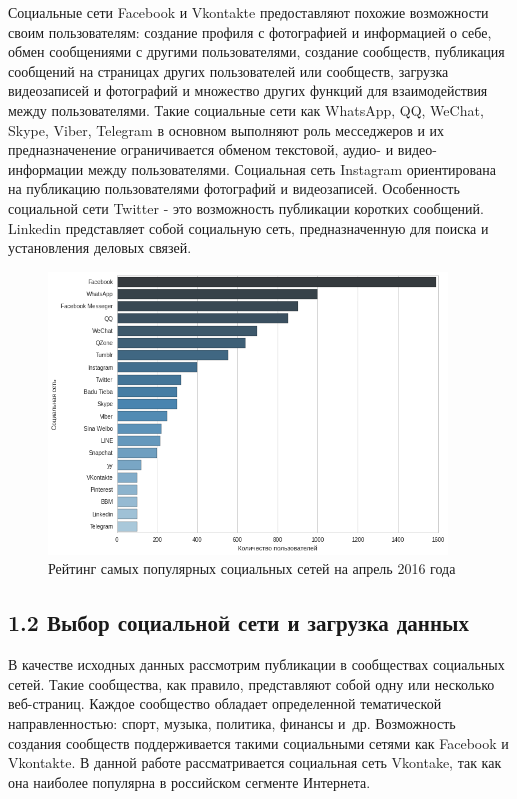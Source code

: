 \documentclass[a4paper]{report}
\begin{document}
	Социальные сети Facebook и Vkontakte предоставляют похожие возможности своим пользователям: создание профиля с фотографией и информацией о себе, обмен сообщениями с другими пользователями, создание сообществ, публикация сообщений на страницах других пользователей или сообществ, загрузка видеозаписей и фотографий и множество других функций для взаимодействия между пользователями. Такие социальные сети как WhatsApp, QQ, WeChat, Skype, Viber, Telegram в основном выполняют роль месседжеров и их предназначенение ограничивается обменом текстовой, аудио- и видео- информации между пользователями. 
	Социальная сеть Instagram ориентирована на публикацию пользователями фотографий и видеозаписей.
	Особенность социальной сети Twitter - это возможность публикации коротких сообщений. Linkedin представляет собой социальную сеть, предназначенную для поиска и установления деловых связей.
	
	
	
	
	


	
	\begin{figure}
		\centering
		\includegraphics[width=400px]
		{imgs/NetworkStatistics.png}
		\caption{Рейтинг самых популярных  социальных сетей на апрель 2016 года}
		\label{fig:stat}
	\end{figure}
	
	
	
	
	
	\subsection{1.2 Выбор социальной сети и загрузка данных}
	
	В качестве исходных данных рассмотрим публикации в сообществах социальных сетей. 
	Такие сообщества, как правило, представляют собой одну или несколько веб-страниц. 
	Каждое сообщество обладает определенной тематической направленностью: спорт, музыка, политика, финансы и~др.
	Возможность создания сообществ поддерживается такими социальными сетями как Facebook и Vkontakte. 
	В данной работе рассматривается социальная сеть Vkontake, так как она наиболее популярна в российском сегменте Интернета.
			
\end{document}
